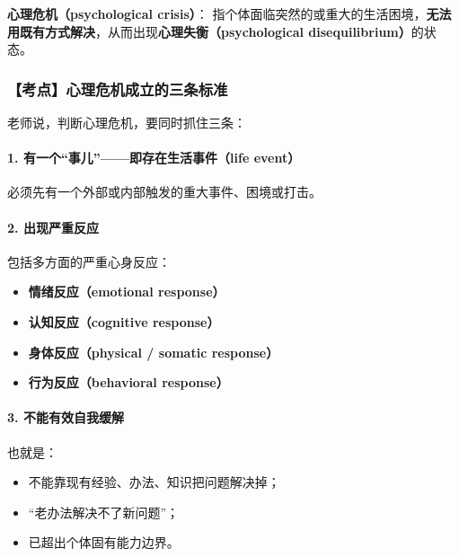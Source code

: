 \documentclass[
  chinese,
  9pt,
  a4paper,
]{ctexart}
\providecommand{\tightlist}{%
  \setlength{\itemsep}{0pt}\setlength{\parskip}{0pt}}
\begin{document}
\textbf{心理危机（psychological crisis）}：
指个体面临突然的或重大的生活困境，\textbf{无法用既有方式解决}，从而出现\textbf{心理失衡（psychological
disequilibrium）}的状态。

\subsubsection{【考点】心理危机成立的三条标准}\label{ux8003ux70b9ux5fc3ux7406ux5371ux673aux6210ux7acbux7684ux4e09ux6761ux6807ux51c6}

老师说，判断心理危机，要同时抓住三条：

\paragraph{1. 有一个``事儿''------即存在生活事件（life
event）}\label{ux6709ux4e00ux4e2aux4e8bux513fux5373ux5b58ux5728ux751fux6d3bux4e8bux4ef6life-event}

必须先有一个外部或内部触发的重大事件、困境或打击。

\paragraph{2. 出现严重反应}\label{ux51faux73b0ux4e25ux91cdux53cdux5e94}

包括多方面的严重心身反应：

\begin{itemize}
\tightlist
\item
  \textbf{情绪反应（emotional response）}
\item
  \textbf{认知反应（cognitive response）}
\item
  \textbf{身体反应（physical / somatic response）}
\item
  \textbf{行为反应（behavioral response）}
\end{itemize}

\paragraph{3.
不能有效自我缓解}\label{ux4e0dux80fdux6709ux6548ux81eaux6211ux7f13ux89e3}

也就是：

\begin{itemize}
\tightlist
\item
  不能靠现有经验、办法、知识把问题解决掉；
\item
  ``老办法解决不了新问题''；
\item
  已超出个体固有能力边界。
\end{itemize}
\end{document}
